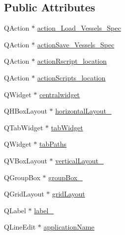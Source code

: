 \subsection*{Public Attributes}
\begin{DoxyCompactItemize}
\item 
Q\+Action $\ast$ \mbox{\hyperlink{class_ui___vessel_editor_main_window_a24b08e448bd10b1cfc5e9bd1d59e020c}{action\+\_\+\+Load\+\_\+\+Vessels\+\_\+\+Spec}}
\item 
Q\+Action $\ast$ \mbox{\hyperlink{class_ui___vessel_editor_main_window_aceb7301bc953280e4a413f44170d1850}{action\+Save\+\_\+\+Vessels\+\_\+\+Spec}}
\item 
Q\+Action $\ast$ \mbox{\hyperlink{class_ui___vessel_editor_main_window_a899d289a07e75582ccbc6fd3d828efd4}{action\+Rscript\+\_\+location}}
\item 
Q\+Action $\ast$ \mbox{\hyperlink{class_ui___vessel_editor_main_window_a4e0bc6e99667fda8c91d537cec76a8c9}{action\+Scripts\+\_\+location}}
\item 
Q\+Widget $\ast$ \mbox{\hyperlink{class_ui___vessel_editor_main_window_abd29288ec1d554f2aa843378dad1aa50}{centralwidget}}
\item 
Q\+H\+Box\+Layout $\ast$ \mbox{\hyperlink{class_ui___vessel_editor_main_window_a9fa3309131800ffb8a1682495c5b4265}{horizontal\+Layout\+\_}}
\item 
Q\+Tab\+Widget $\ast$ \mbox{\hyperlink{class_ui___vessel_editor_main_window_a8cf38728d53b2dfd863353ee19fed74b}{tab\+Widget}}
\item 
Q\+Widget $\ast$ \mbox{\hyperlink{class_ui___vessel_editor_main_window_a5b0d5b4290268a78b096e2ed1e91dd11}{tab\+Paths}}
\item 
Q\+V\+Box\+Layout $\ast$ \mbox{\hyperlink{class_ui___vessel_editor_main_window_ab78a580d5667d91e6c8a9ff3760f56ba}{vertical\+Layout\+\_}}
\item 
Q\+Group\+Box $\ast$ \mbox{\hyperlink{class_ui___vessel_editor_main_window_a199b9cfe2012c0f925a47e1f4b052d4f}{group\+Box\+\_}}
\item 
Q\+Grid\+Layout $\ast$ \mbox{\hyperlink{class_ui___vessel_editor_main_window_a2d821c42501c142a6e1ab3721b07447e}{grid\+Layout}}
\item 
Q\+Label $\ast$ \mbox{\hyperlink{class_ui___vessel_editor_main_window_a3be9cae22b14252c864700d0daf0b676}{label\+\_}}
\item 
Q\+Line\+Edit $\ast$ \mbox{\hyperlink{class_ui___vessel_editor_main_window_a1583bb2a01cae40f4a37afb81ab9ed5e}{application\+Name}}

\end{DoxyCompactItemize}
